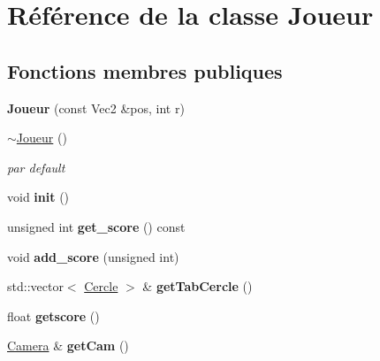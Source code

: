 \hypertarget{class_joueur}{}\section{Référence de la classe Joueur}
\label{class_joueur}
\subsection*{Fonctions membres publiques}
\begin{DoxyCompactItemize}
\item 
\mbox{\label{class_joueur_a9ee3f630c46d3612f87a72f75b3c7d76}} 
{\bfseries Joueur} (const Vec2 \&pos, int r)
\item 
\mbox{\label{class_joueur_a9fb594f755601ee77ce5884c4c0861f3}} 
\mbox{\hyperlink{class_joueur_a9fb594f755601ee77ce5884c4c0861f3}{$\sim$\+Joueur}} ()
\begin{DoxyCompactList}\small\item\em par default \end{DoxyCompactList}\item 
\mbox{\label{class_joueur_a51be65b4cbb2bb9532fcd3de64ad42c9}} 
void {\bfseries init} ()
\item 
\mbox{\label{class_joueur_a75e77168767d1130487144140a49ea70}} 
unsigned int {\bfseries get\+\_\+score} () const
\item 
\mbox{\label{class_joueur_a47ff930f196fbf7d4a9b9aa5dd739674}} 
void {\bfseries add\+\_\+score} (unsigned int)
\item 
\mbox{\label{class_joueur_af7eb934fee4850dbee462915ec0c82a1}} 
std\+::vector$<$ \mbox{\hyperlink{class_cercle}{Cercle}} $>$ \& {\bfseries get\+Tab\+Cercle} ()
\item 
\mbox{\label{class_joueur_acbf9b39bfd457782dcfc4de9c132409c}} 
float {\bfseries getscore} ()
\item 
\mbox{\label{class_joueur_a524e909f135fff3c619d9cb3f3681ae7}} 
\mbox{\hyperlink{class_camera}{Camera}} \& {\bfseries get\+Cam} ()
\item 
\mbox{\label{class_joueur_acda840df5fc63d8463c3040100197e30}} 

\end{DoxyCompactItemize}
